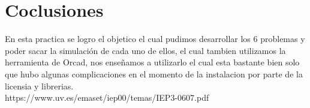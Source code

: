 \documentclass[10pt,a4paper]{article}
\begin{document}
\newpage
\section{Coclusiones}
En esta practica se logro el objetico el cual pudimos desarrollar los 6 problemas y poder sacar la simulación de cada uno de ellos, el cual tambien utilizamos la herramienta de Orcad, nos enseñamos a utilizarlo el cual esta bastante bien solo que hubo algunas complicaciones en el momento de la instalacion por parte de la licensia y librerias.\\

{https://www.uv.es/emaset/iep00/temas/IEP3-0607.pdf}

\end{document}
